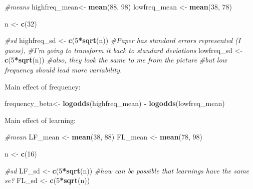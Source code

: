 \documentclass[
]{article}
\newenvironment{Shaded}{\begin{snugshade}}{\end{snugshade}}
\newcommand{\CommentTok}[1]{\textcolor[rgb]{0.56,0.35,0.01}{\textit{#1}}}
\newcommand{\DecValTok}[1]{\textcolor[rgb]{0.00,0.00,0.81}{#1}}
\newcommand{\KeywordTok}[1]{\textcolor[rgb]{0.13,0.29,0.53}{\textbf{#1}}}
\newcommand{\NormalTok}[1]{#1}
\newcommand{\OperatorTok}[1]{\textcolor[rgb]{0.81,0.36,0.00}{\textbf{#1}}}
\newcommand{\StringTok}[1]{\textcolor[rgb]{0.31,0.60,0.02}{#1}}
\begin{document}
\begin{Shaded}
\begin{Highlighting}[]
\CommentTok{#means}
\NormalTok{highfreq_mean<-}\StringTok{ }\KeywordTok{mean}\NormalTok{(}\DecValTok{88}\NormalTok{, }\DecValTok{98}\NormalTok{)}
\NormalTok{lowfreq_mean <-}\StringTok{ }\KeywordTok{mean}\NormalTok{(}\DecValTok{38}\NormalTok{, }\DecValTok{78}\NormalTok{)}

\NormalTok{n <-}\StringTok{ }\KeywordTok{c}\NormalTok{(}\DecValTok{32}\NormalTok{) }

\CommentTok{#sd}
\NormalTok{highfreq_sd <-}\StringTok{ }\KeywordTok{c}\NormalTok{(}\DecValTok{5}\OperatorTok{*}\KeywordTok{sqrt}\NormalTok{(n))  }\CommentTok{#Paper has standard errors represented (I guess),}
                     \CommentTok{#I'm going to transform it back to standard deviations}
\NormalTok{lowfreq_sd <-}\StringTok{ }\KeywordTok{c}\NormalTok{(}\DecValTok{5}\OperatorTok{*}\KeywordTok{sqrt}\NormalTok{(n)) }\CommentTok{#also, they look the same to me from the picture}
                           \CommentTok{#but low frequency should lead more variability.}
\end{Highlighting}
\end{Shaded}

Main effect of frequency:

\begin{Shaded}
\begin{Highlighting}[]
\NormalTok{frequency_beta<-}\StringTok{ }\KeywordTok{logodds}\NormalTok{(highfreq_mean) }\OperatorTok{-}\StringTok{ }\KeywordTok{logodds}\NormalTok{(lowfreq_mean)}
\end{Highlighting}
\end{Shaded}

Main effect of learning:

\begin{Shaded}
\begin{Highlighting}[]
\CommentTok{#mean}
\NormalTok{LF_mean <-}\StringTok{ }\KeywordTok{mean}\NormalTok{(}\DecValTok{38}\NormalTok{, }\DecValTok{88}\NormalTok{)}
\NormalTok{FL_mean <-}\StringTok{ }\KeywordTok{mean}\NormalTok{(}\DecValTok{78}\NormalTok{, }\DecValTok{98}\NormalTok{)}

\NormalTok{n <-}\StringTok{ }\KeywordTok{c}\NormalTok{(}\DecValTok{16}\NormalTok{)}

\CommentTok{#sd}
\NormalTok{LF_sd <-}\StringTok{ }\KeywordTok{c}\NormalTok{(}\DecValTok{5}\OperatorTok{*}\KeywordTok{sqrt}\NormalTok{(n)) }\CommentTok{#how can be possible that learnings have the same se?}
\NormalTok{FL_sd <-}\StringTok{ }\KeywordTok{c}\NormalTok{(}\DecValTok{5}\OperatorTok{*}\KeywordTok{sqrt}\NormalTok{(n))}
\end{Highlighting}
\end{Shaded}
\end{document}
